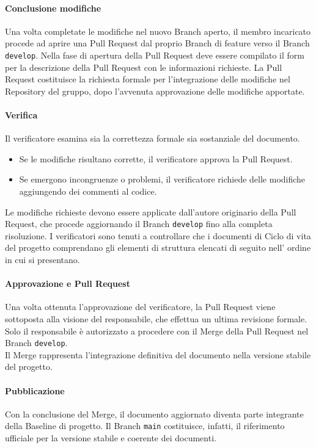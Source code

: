 \documentclass[a4paper,12pt]{article}
\newcommand{\ignoreglossary}{}
\begin{document}
\paragraph{Conclusione modifiche} 
Una volta completate le modifiche nel nuovo Branch aperto, il membro incaricato procede ad aprire una Pull Request dal proprio Branch di feature verso il Branch \texttt{develop}. 
Nella fase di apertura della Pull Request deve essere compilato il form per la descrizione della Pull Request con le informazioni richieste. La Pull Request costituisce la richiesta formale per l'integrazione delle modifiche nel Repository del gruppo, dopo l'avvenuta approvazione delle modifiche apportate.

\paragraph{\ignoreglossary{Verifica}} Il verificatore esamina sia la correttezza formale sia sostanziale del documento.
    \begin{itemize}
        \item Se le modifiche risultano corrette, il verificatore approva la Pull Request.
        \item Se emergono incongruenze o problemi, il verificatore richiede delle modifiche aggiungendo dei commenti al codice.
    \end{itemize}
Le modifiche richieste devono essere applicate dall’autore originario della Pull Request, che procede aggiornando il Branch \texttt{develop} fino alla completa risoluzione.
I verificatori sono tenuti a controllare che i documenti di Ciclo di vita del progetto comprendano gli elementi di struttura elencati di seguito nell' ordine in cui si presentano.

\paragraph{Approvazione e \ignoreglossary{Pull Request}} Una volta ottenuta l’approvazione del verificatore, la Pull Request viene sottoposta alla visione del responsabile, che effettua un ultima revisione formale. Solo il responsabile è autorizzato a procedere con il Merge della Pull Request nel Branch \texttt{develop}.
\\Il Merge rappresenta l’integrazione definitiva del documento nella versione stabile del progetto.

\paragraph{Pubblicazione} Con la conclusione del Merge, il documento aggiornato diventa parte integrante della Baseline di progetto. Il Branch \texttt{main} costituisce, infatti, il riferimento ufficiale per la versione stabile e coerente dei documenti.
\end{document}
